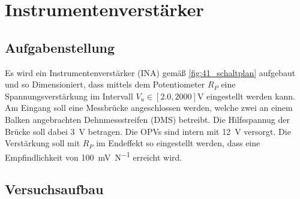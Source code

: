 \section{Instrumentenverstärker}\label{sec:5}

\subsection{Aufgabenstellung}

Es wird ein Instrumentenverstärker (INA) gemäß \autoref{fig:41_schaltplan} aufgebaut und so Dimensioniert, dass mittels dem Potentiometer $R_P$ eine Spannungsverstärkung im Intervall $V_u \in [2.0, 2000]\si{\volt}$ eingestellt werden kann. Am Eingang soll eine Messbrücke angeschlossen werden, welche zwei an einem Balken angebrachten Dehnmessstreifen (DMS) betreibt. Die Hilfsspannug der Brücke soll dabei \SI{3}{\volt} betragen. Die OPVs sind intern mit \SI{12}{\volt} versorgt. Die Verstärkung soll mit $R_P$ im Endeffekt so eingestellt werden, dass eine Empfindlichkeit von \SI{100}{\milli\volt\per\newton} erreicht wird.

\subsection{Versuchsaufbau}

